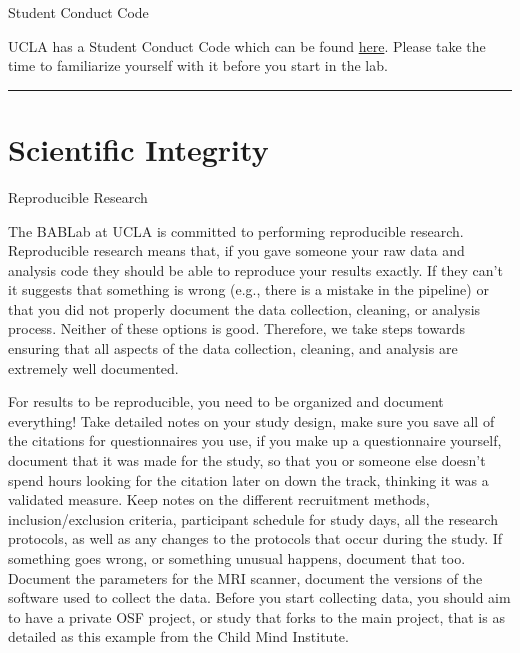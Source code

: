 \documentclass[]{book}
\begin{document}
Student Conduct Code

UCLA has a Student Conduct Code which can be found \href{https://www.deanofstudents.ucla.edu/Individual-Student-Code}{here}. Please take the time to familiarize yourself with it before you start in the lab.

\begin{center}\rule{0.5\linewidth}{0.5pt}\end{center}

\hypertarget{scientific-integrity}{%
\section{Scientific Integrity}\label{scientific-integrity}}

Reproducible Research

The BABLab at UCLA is committed to performing reproducible research. Reproducible research means that, if you gave someone your raw data and analysis code they should be able to reproduce your results exactly. If they can't it suggests that something is wrong (e.g., there is a mistake in the pipeline) or that you did not properly document the data collection, cleaning, or analysis process. Neither of these options is good. Therefore, we take steps towards ensuring that all aspects of the data collection, cleaning, and analysis are extremely well documented.

For results to be reproducible, you need to be organized and document everything! Take detailed notes on your study design, make sure you save all of the citations for questionnaires you use, if you make up a questionnaire yourself, document that it was made for the study, so that you or someone else doesn't spend hours looking for the citation later on down the track, thinking it was a validated measure. Keep notes on the different recruitment methods, inclusion/exclusion criteria, participant schedule for study days, all the research protocols, as well as any changes to the protocols that occur during the study. If something goes wrong, or something unusual happens, document that too. Document the parameters for the MRI scanner, document the versions of the software used to collect the data. Before you start collecting data, you should aim to have a private OSF project, or study that forks to the main project, that is as detailed as this example from the Child Mind Institute.
\end{document}
